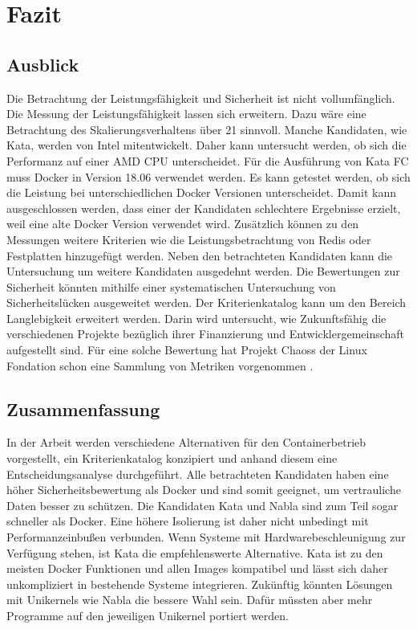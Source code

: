 \chapter{Fazit}

\section{Ausblick}

Die Betrachtung der Leistungsfähigkeit und Sicherheit ist nicht vollumfänglich. Die Messung der Leistungsfähigkeit lassen sich erweitern. Dazu wäre eine Betrachtung des Skalierungsverhaltens über 21 sinnvoll. Manche Kandidaten, wie Kata, werden von Intel mitentwickelt. Daher kann untersucht werden, ob sich die Performanz auf einer AMD CPU unterscheidet. Für die Ausführung von Kata FC muss Docker in Version 18.06 verwendet werden. Es kann getestet werden, ob sich die Leistung bei unterschiedlichen Docker Versionen unterscheidet. Damit kann ausgeschlossen werden, dass einer der Kandidaten schlechtere Ergebnisse erzielt, weil eine alte Docker Version verwendet wird. Zusätzlich können zu den Messungen weitere Kriterien wie die Leistungsbetrachtung von Redis oder Festplatten hinzugefügt werden. Neben den betrachteten Kandidaten kann die Untersuchung um weitere Kandidaten ausgedehnt werden.
Die Bewertungen zur Sicherheit könnten mithilfe einer systematischen Untersuchung von Sicherheitslücken ausgeweitet werden.
Der Kriterienkatalog kann um den Bereich Langlebigkeit erweitert werden. Darin wird untersucht, wie Zukunftsfähig die verschiedenen Projekte bezüglich ihrer Finanzierung und Entwicklergemeinschaft aufgestellt sind. Für eine solche Bewertung hat Projekt Chaoss der Linux Fondation schon eine Sammlung von Metriken vorgenommen \cite[][]{chaoss}.


\section{Zusammenfassung}

In der Arbeit werden verschiedene Alternativen für den Containerbetrieb vorgestellt, ein Kriterienkatalog konzipiert und anhand diesem eine Entscheidungsanalyse durchgeführt. Alle betrachteten Kandidaten haben eine höher Sicherheitsbewertung als Docker und sind somit geeignet, um vertrauliche Daten besser zu schützen. Die Kandidaten Kata und Nabla sind zum Teil sogar schneller als Docker. Eine höhere Isolierung ist daher nicht unbedingt mit Performanzeinbußen verbunden. Wenn Systeme mit Hardwarebeschleunigung zur Verfügung stehen, ist Kata die empfehlenswerte Alternative. Kata ist zu den meisten Docker Funktionen und allen Images kompatibel und lässt sich daher unkompliziert in bestehende Systeme integrieren. Zukünftig könnten Lösungen mit Unikernels wie Nabla die bessere Wahl sein. Dafür müssten aber mehr Programme auf den jeweiligen Unikernel portiert werden.